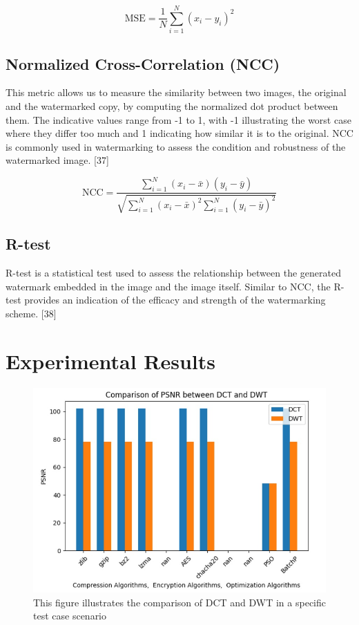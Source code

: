 \documentclass[conference]{IEEEtran}
\begin{document}
\begin{equation}
\text{MSE} = \frac{1}{N} \sum_{i=1}^{N} (x_i - y_i)^2
\tag*{(3)}
\end{equation}


\subsection{Normalized Cross-Correlation (NCC)}
This metric allows us to measure the similarity between two images, the original and the watermarked copy, by computing the normalized dot product between them. The indicative values range from -1 to 1, with -1 illustrating the worst case where they differ too much and 1 indicating how similar it is to the original. NCC is commonly used in watermarking to assess the condition and robustness of the watermarked image. [37]

\begin{equation}
\text{NCC} = \frac{\sum_{i=1}^{N} (x_i - \bar{x})(y_i - \bar{y})}{\sqrt{\sum_{i=1}^{N} (x_i - \bar{x})^2 \sum_{i=1}^{N} (y_i - \bar{y})^2}}
\tag*{(4)}
\end{equation}


\subsection{R-test}
R-test is a statistical test used to assess the relationship between the generated watermark embedded in the image and the image itself. Similar to NCC, the R-test provides an indication of the efficacy and strength of the watermarking scheme. [38]





\section{Experimental Results}

\begin{figure}[htbp]
\centering
\includegraphics[width=0.9\columnwidth]{PSNR.jpg}
\caption{This figure illustrates the comparison of DCT and DWT in a specific test case scenario}
\label{fig}
\end{figure}
\end{document}
